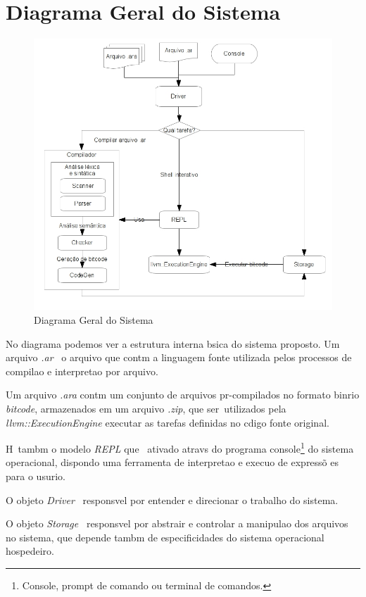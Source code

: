\section{Diagrama Geral do Sistema}

\label{pro:dgs}

\begin{figure}[htp]
  \begin{center}
    \includegraphics[width=1\textwidth]{figuras/dgs}
  \end{center}
  \caption{Diagrama Geral do Sistema}
  \label{fig:dgs}
\end{figure}

No diagrama podemos ver a estrutura interna b\ah sica do sistema proposto. Um arquivo \emph{.ar} \eh\ o arquivo que cont\eh m a linguagem fonte utilizada pelos processos de compila\ca o e interpreta\ca o por arquivo.

Um arquivo \emph{.ara} cont\eh m um conjunto de arquivos pr\eh-compilados no formato bin\ah rio \emph{bitcode}, armazenados em um arquivo \emph{.zip}, que ser\ao\ utilizados pela \emph{llvm::ExecutionEngine} executar as tarefas definidas no c\oh digo fonte original.

H\ah\ tamb\eh m o modelo \emph{REPL} que \eh\ ativado atrav\eh s do programa console\footnote{Console, prompt de comando ou terminal de comandos.} do sistema operacional, dispondo uma ferramenta de interpreta\ca o e execu\ca o de express\~o es para o usu\ah rio.

O objeto \emph{Driver} \eh\ respons\ah vel por entender e direcionar o trabalho do sistema.

O objeto \emph{Storage} \eh\ respons\ah vel por abstrair e controlar a manipula\ca o dos arquivos no sistema, que depende tamb\eh m de especificidades do sistema operacional hospedeiro.
